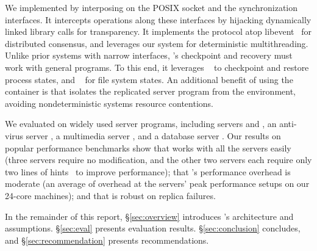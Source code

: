 

We implemented \xxx by interposing on the POSIX socket and the \pthread
synchronization interfaces.  It intercepts operations along these
interfaces by hijacking dynamically linked library calls for transparency.
It implements the \paxos protocol atop libevent~\cite{libevent} for
distributed consensus, and leverages our \parrot system for deterministic
multithreading.  Unlike prior \smr systems with narrow interfaces, \xxx's
checkpoint and recovery must work with general programs. To this end, it
leverages \criu~\cite{criu} to checkpoint and restore process states, and
\lxc~\cite{lxc} for file system states.  An additional benefit of using
the \lxc container is that \xxx isolates the replicated server program
from the environment, avoiding nondeterministic systems resource contentions.


We evaluated \xxx on \nprog widely used server programs,
including \http servers \apache and \mongoose, an anti-virus server
\clamav, a \upnp multimedia server \mediatomb, and a database server \mysql. 
Our results on popular performance benchmarks show that \xxx works with
all the servers easily (three servers require no modification, and the
other two servers each require only two lines of \parrot hints~\cite{parrot:sosp13}
to improve performance); that \xxx's performance overhead is
moderate (an average of \overhead overhead at the servers' peak 
performance setups on our 24-core machines); and that \xxx is robust on replica 
failures.

In the remainder of this report, \S\ref{sec:overview} introduces \xxx's 
architecture and assumptions. \S\ref{sec:eval} presents evaluation results. 
\S\ref{sec:conclusion} concludes, and \S\ref{sec:recommendation} presents 
recommendations.



























